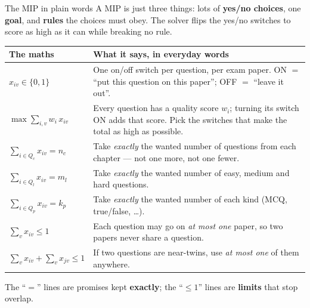 \documentclass[11pt,aspectratio=169]{beamer}
\begin{document}
\begin{frame}{The MIP in plain words}
  A MIP is just three things: lots of \textbf{yes/no choices}, one \textbf{goal},
  and \textbf{rules} the choices must obey. The solver flips the yes/no switches
  to score as high as it can while breaking no rule.

  \vspace{1mm}
  \begin{center}\scriptsize
  \begin{tabular}{@{}p{4.2cm}p{8.3cm}@{}}
  \toprule
  \textbf{The maths} & \textbf{What it says, in everyday words} \\
  \midrule
  $x_{iv}\in\{0,1\}$ &
    One on/off switch per question, per exam paper. ON $=$ ``put this question on
    this paper''; OFF $=$ ``leave it out''. \\[1mm]
  $\max \sum_{i,v} w_i\,x_{iv}$ &
    Every question has a quality score $w_i$; turning its switch ON adds that
    score. Pick the switches that make the total as high as possible. \\[1mm]
  $\sum_{i\in Q_c} x_{iv}=n_c$ &
    Take \emph{exactly} the wanted number of questions from each chapter --- not
    one more, not one fewer. \\[1mm]
  $\sum_{i\in Q_l} x_{iv}=m_l$ &
    Take \emph{exactly} the wanted number of easy, medium and hard questions. \\[1mm]
  $\sum_{i\in Q_p} x_{iv}=k_p$ &
    Take \emph{exactly} the wanted number of each kind (MCQ, true/false, \ldots). \\[1mm]
  $\sum_{v} x_{iv}\le 1$ &
    Each question may go on \emph{at most one} paper, so two papers never share a
    question. \\[1mm]
  $\sum_{v}x_{iv}+\sum_{v}x_{jv}\le 1$ &
    If two questions are near-twins, use \emph{at most one} of them anywhere. \\
  \bottomrule
  \end{tabular}
  \end{center}

  \vspace{0.5mm}
  {\footnotesize The ``$=$'' lines are promises kept \textbf{exactly}; the
  ``$\le 1$'' lines are \textbf{limits} that stop overlap.}
\end{frame}
\end{document}
